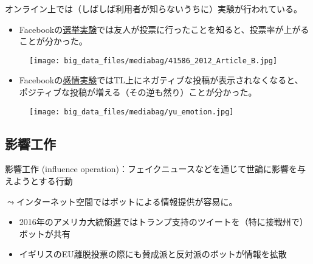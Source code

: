 \documentclass[
  xelatex,
  ja=standard]{bxjsarticle}
\providecommand{\tightlist}{%
  \setlength{\itemsep}{0pt}\setlength{\parskip}{0pt}}\usepackage{longtable,booktabs,array}
\begin{document}
オンライン上では（しばしば利用者が知らないうちに）実験が行われている。

\begin{itemize}
\tightlist
\item
  Facebookの\href{https://www.afpbb.com/articles/-/2900894}{選挙実験}では友人が投票に行ったことを知ると、投票率が上がることが分かった。
\end{itemize}

\begin{figure}[htpb]

{\centering \texttt{[image: big\_data\_files/mediabag/41586\_2012\_Article\_B.jpg]}

}

\caption{\citet{bond2012}}

\end{figure}

\begin{itemize}
\tightlist
\item
  Facebookの\href{https://www.itmedia.co.jp/news/articles/1406/29/news007.html}{感情実験}ではTL上にネガティブな投稿が表示されなくなると、ポジティブな投稿が増える（その逆も然り）ことが分かった。
\end{itemize}

\begin{figure}[htpb]

{\centering \texttt{[image: big\_data\_files/mediabag/yu\_emotion.jpg]}

}

\caption{\citet{kramer2014}}

\end{figure}

\hypertarget{ux5f71ux97ffux5de5ux4f5c}{%
\subsection{影響工作}\label{ux5f71ux97ffux5de5ux4f5c}}

影響工作 (influence
operation)：フェイクニュースなどを通じて世論に影響を与えようとする行動

\(\leadsto\)インターネット空間ではボットによる情報提供が容易に\citep{lazer2009, ferrara2016}。

\begin{itemize}
\tightlist
\item
  2016年のアメリカ大統領選ではトランプ支持のツイートを（特に接戦州で）ボットが共有
\item
  イギリスのEU離脱投票の際にも賛成派と反対派のボットが情報を拡散
\end{itemize}
\end{document}
